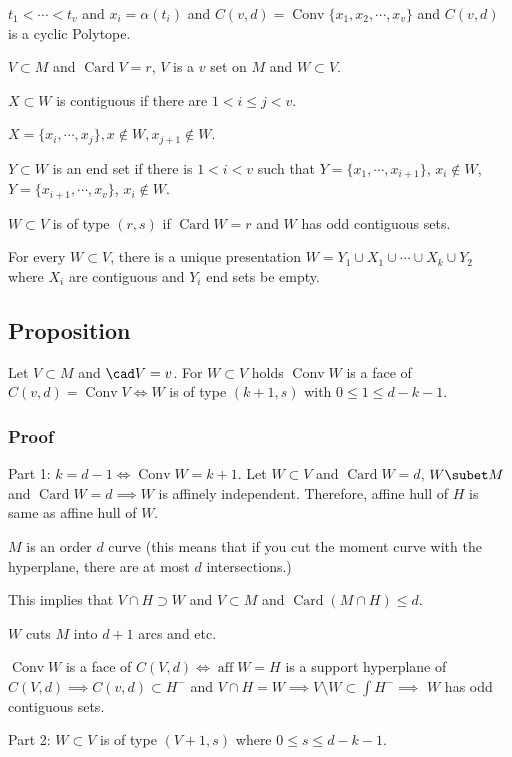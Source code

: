 \documentclass[11pt]{article}
\def\aff{\operatorname{aff}}
\def\conv{\operatorname{Conv}}
\def\card{\operatorname{Card}}
\begin{document}
{{\(t_1 < \cdots < t_v\) and \(x_i = \alpha(t_i)\) and \(C(v, d) = \conv \{x_1, x_2,
   \cdots, x_v\}\) and \(C(v, d)\) is a cyclic Polytope.

\(V \subset M\) and \(\card V = r\), \(V\) is a \(v\) set on \(M\) and \(W \subset V\).

\(X \subset W\) is contiguous if there are \(1 < i \le j < v\).

\(X = \{x_i, \cdots, x_j\}, x \notin W, x_{j+1} \notin W\).

\(Y \subset W\) is an end set if there is \(1 < i < v\) such that \(Y = \{x_1,
   \cdots, x_{i+1}\}\), \(x_i \notin W\), \(Y = \{x_{i+1}, \cdots, x_v\}\), \(x_i
   \notin W\).

\(W \subset V\) is of type \((r, s)\) if \(\card W = r\) and \(W\) has odd contiguous
sets.

For every \(W \subset V\), there is a unique presentation \(W = Y_1 \cup X_1
   \cup \cdots \cup X_k \cup Y_2\) where \(X_i\) are contiguous and \(Y_i\) end sets
be empty.
\subsection{Proposition}
\label{sec:org301ccb9}
Let \(V \subset M\) and \(\cad V = v\). For \(W \subset V\) holds \(\conv W\) is a
face of \(C(v, d) = \conv V \iff W\) is of type \((k+1, s)\) with \(0 \le 1 \le d-
   k- 1\).
\subsubsection{Proof}
\label{sec:org1aae735}
Part 1: \(k = d-1 \iff \conv W = k+1\). Let \(W \subset V\) and \(\card W = d\),
\(W \subet M\) and \(\card W = d \implies W\) is affinely independent.
Therefore, affine hull of \(H\) is same as affine hull of \(W\).

\(M\) is an order \(d\) curve (this means that if you cut the moment curve with
the hyperplane, there are at most \(d\) intersections.)

This implies that \(V \cap H \supset W\) and \(V \subset M\) and \(\card(M \cap
    H) \le d\). 

\(W\) cuts \(M\) into \(d+1\) arcs and etc.

\(\conv W\) is a face of \(C(V, d) \iff \aff W = H\) is a support hyperplane of
\(C(V, d) \implies C(v, d) \subset H^{-}\) and \(V \cap H = W \implies V
    \setminus W \subset \int H^{-} \implies\) \(W\) has odd contiguous sets.

Part 2: \(W \subset V\) is of type \((V + 1, s)\) where \(0 \le s \le d - k- 1\).

}}
\end{document}
